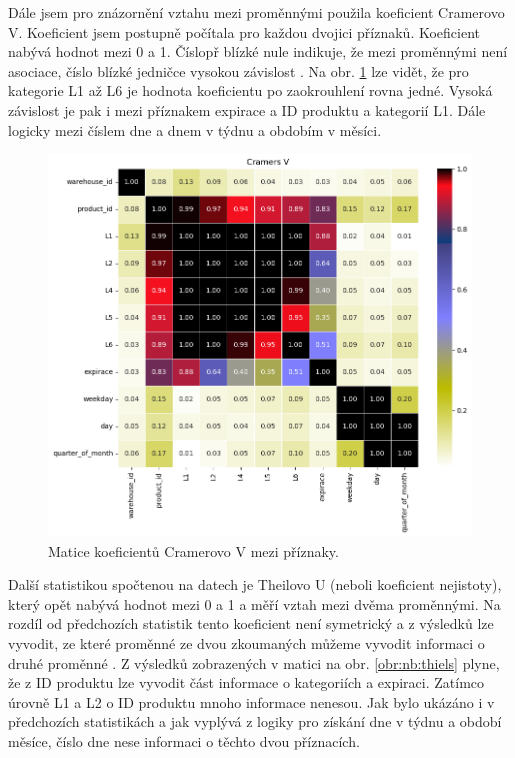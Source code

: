 Dále jsem pro znázornění vztahu mezi proměnnými použila koeficient Cramerovo V. Koeficient jsem postupně počítala pro každou dvojici příznaků. Koeficient nabývá hodnot mezi 0 a 1. Číslopř blízké nule indikuje, že mezi proměnnými není asociace, číslo blízké jedničce vysokou závislost \cite{bib:statology}. Na obr. \ref*{obr:nb:cramers} lze vidět, že pro kategorie L1 až L6 je hodnota koeficientu  po zaokrouhlení rovna jedné. Vysoká závislost je pak i mezi příznakem expirace a ID produktu a kategorií L1. Dále logicky mezi číslem dne a dnem v týdnu a obdobím v měsíci.
\begin{figure}[hbtp!]
    \centering
    \includegraphics[width=.8\textwidth]{obrazky/zntb/cramers_u.png}
    \caption{Matice koeficientů Cramerovo V mezi příznaky.}
    \label{obr:nb:cramers}
\end{figure}

Další statistikou spočtenou na datech je Theilovo U (neboli koeficient nejistoty), který opět nabývá hodnot mezi 0 a 1 a měří vztah mezi dvěma proměnnými. Na rozdíl od předchozích statistik tento koeficient není symetrický a z výsledků lze vyvodit, ze které proměnné ze dvou zkoumaných můžeme vyvodit informaci o druhé proměnné \cite{bib:correl}. Z výsledků zobrazených v matici na obr. \ref*{obr:nb:thiels} plyne, že z ID produktu lze vyvodit část informace o kategoriích a expiraci. Zatímco úrovně L1 a L2 o ID produktu mnoho informace nenesou. Jak bylo ukázáno i v předchozích statistikách a jak vyplývá z logiky pro získání dne v týdnu a období měsíce, číslo dne nese informaci o těchto dvou příznacích.


